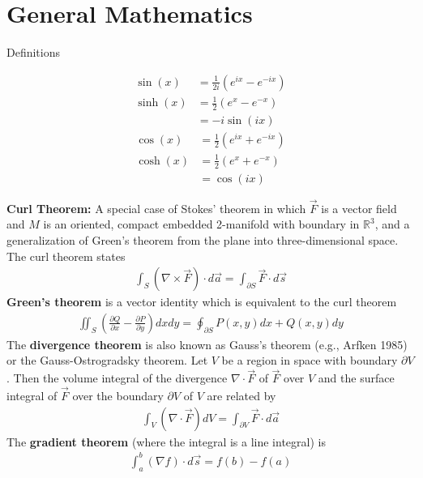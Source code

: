 \chapter{General Mathematics}
\thispagestyle{fancy}
Definitions
\begin{multicols}{2}
	\noindent
	\begin{align}
	\sin(x) &=\frac{1}{2i}(e^{ix}-e^{-ix}) \\
	\sinh(x) &= \frac{1}{2}(e^{x}-e^{-x}) \\
	&= -i\sin(ix)
	\end{align}
	\begin{align}
	\cos(x) &=\frac{1}{2}(e^{ix}+e^{-ix}) \\
	\cosh(x) &=\frac{1}{2}(e^{x}+e^{-x}) \\
	&= \cos(ix)
	\end{align}
\end{multicols}
\textbf{Curl Theorem:} A special case of Stokes' theorem in which $\vec{F}$ is a vector field and $M$ is an oriented, compact embedded 2-manifold with boundary in $\mathbb{R}^3$, and a generalization of Green's theorem from the plane into three-dimensional space. The curl theorem states 
\begin{align}
	\int_S (\nabla \times \vec{F})\cdot d\vec{a} = \int_{\partial S}\vec{F} \cdot d\vec{s}
\end{align}
\textbf{Green's theorem} is a vector identity which is equivalent to the curl theorem 
\begin{align}
	\iint_S \left(\frac{\partial Q}{\partial x}-\frac{\partial P}{\partial y}\right) dxdy = \oint_{\partial S} P(x,y)dx+Q(x,y)dy
\end{align}
The \textbf{divergence theorem} is also known as Gauss's theorem (e.g., Arfken 1985) or the Gauss-Ostrogradsky theorem. Let $V$	 be a region in space with boundary $\partial V$. Then the volume integral of the divergence $\nabla \cdot \vec{F}$ of $\vec{F}$ over $V$ and the surface integral of $\vec{F}$ over the boundary $\partial V$ of $V$ are related by 
\begin{align}
	\int_V (\nabla \cdot \vec{F}) dV = \int_{\partial V}\vec{F} \cdot d\vec{a}
\end{align}
The \textbf{gradient theorem} (where the integral is a line integral) is
\begin{align}
	\int_a^b (\nabla f) \cdot d\vec{s} = f(b)-f(a)
\end{align}
